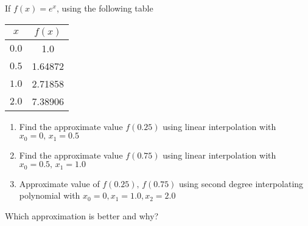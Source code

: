 \documentclass[12pt,class=book,crop=false]{standalone}
\begin{document}
\begin{prob}
    If \(  f(x)=e^x \), using the following table
    \begin{center}
        \begin{tabular}{cS[table-format=3.5]}
            \toprule
            \(  x \)   &  \\\midrule
            \(  0.0 \) & 1.0                             \\
            \(  0.5 \) & 1.64872                         \\
            \(  1.0 \) & 2.71858                         \\
            \(  2.0 \) & 7.38906                         \\\bottomrule
        \end{tabular}
    \end{center}
    \begin{enumerate}
        \item Find the approximate value \(  f(0.25) \) using linear interpolation with \(  x_0=0,\, x_1=0.5 \)
        \item Find the approximate value \(  f(0.75) \) using linear interpolation with \(  x_0=0.5,\, x_1=1.0 \)
        \item Approximate value of \( f(0.25), \,f(0.75) \) using second degree interpolating polynomial with \( x_0=0,x_1=1.0,x_2=2.0 \)
    \end{enumerate}
    Which approximation is better and why?
\end{prob}
\end{document}
